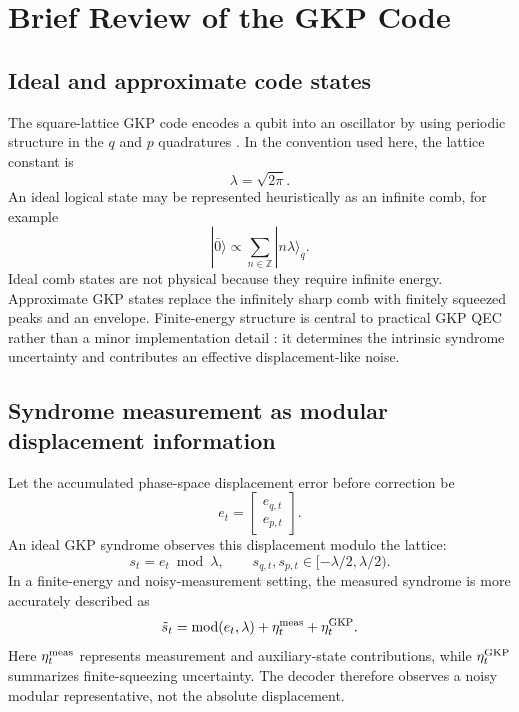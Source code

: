 \documentclass[11pt]{article}
\begin{document}
\section{Brief Review of the GKP Code}

\subsection{Ideal and approximate code states}

The square-lattice GKP code encodes a qubit into an oscillator by using
periodic structure in the \(q\) and \(p\) quadratures \cite{gkp2001}.  In the
convention used here, the lattice constant is
\begin{equation}
    \lambda=\sqrt{2\pi}.
\end{equation}
An ideal logical state may be represented heuristically as an infinite comb,
for example
\begin{equation}
    |\bar 0\rangle \propto \sum_{n\in\mathbb{Z}} |n\lambda\rangle_q .
\end{equation}
Ideal comb states are not physical because they require infinite energy.
Approximate GKP states replace the infinitely sharp comb with finitely squeezed
peaks and an envelope.  Finite-energy structure is central to practical GKP
QEC rather than a minor implementation detail \cite{grimsmo2021}: it
determines the intrinsic syndrome uncertainty and contributes an effective
displacement-like noise.

\subsection{Syndrome measurement as modular displacement information}

Let the accumulated phase-space displacement error before correction be
\begin{equation}
    e_t=\begin{bmatrix}e_{q,t}\\e_{p,t}\end{bmatrix}.
\end{equation}
An ideal GKP syndrome observes this displacement modulo the lattice:
\begin{equation}
    s_t = e_t \bmod \lambda,
    \qquad
    s_{q,t},s_{p,t}\in[-\lambda/2,\lambda/2).
\end{equation}
In a finite-energy and noisy-measurement setting, the measured syndrome is
more accurately described as
\begin{equation}
    \tilde{s}_t={\rm mod}(e_t,\lambda)+\eta_t^{\rm meas}+\eta_t^{\rm GKP}.
\end{equation}
Here \(\eta_t^{\rm meas}\) represents measurement and auxiliary-state
contributions, while \(\eta_t^{\rm GKP}\) summarizes finite-squeezing
uncertainty.  The decoder therefore observes a noisy modular representative,
not the absolute displacement.
\end{document}
